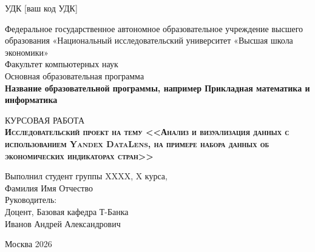\begin{titlepage}
\newpage
\raggedleft
    УДК [ваш код УДК]
{
\begin{center}
Федеральное государственное автономное образовательное учреждение высшего образования «Национальный исследовательский университет «Высшая школа экономики»
\\
\bigskip
Факультет компьютерных наук \\
Основная образовательная программа \\
\textbf{Название образовательной программы, например Прикладная математика и информатика \\}
\end{center}
}

\vspace{8em}

\begin{center}
{\Large КУРСОВАЯ РАБОТА}\\
\textsc{\textbf{
Исследовательский проект на тему
\linebreak
<<Анализ и визуализация данных с использованием Yandex DataLens, на примере набора данных об экономических индикаторах стран>>}}
\end{center}

\vspace{2em}
    
    {
    \hfill\parbox{16cm}{
    \hspace*{5cm}\hspace*{-5cm}Выполнил студент группы XXXX, X курса,\\
     Фамилия Имя Отчество\\
     
    \hspace*{5cm}\hspace*{-5cm}Руководитель:\\
    Доцент, Базовая кафедра Т-Банка \\
    Иванов Андрей Александрович}}
    
\vspace{\fill}


\begin{center}
Москва 2026
\end{center}

\end{titlepage}